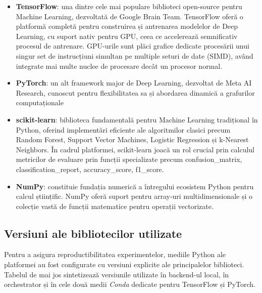 \documentclass[../../main.tex]{subfiles}
\begin{document}
        \begin{itemize}
	            \item \textbf{TensorFlow}: una dintre cele mai populare biblioteci open-source pentru Machine Learning, dezvoltată de Google Brain Team. TensorFlow oferă o platformă completă pentru construirea și antrenarea modelelor de Deep Learning, cu suport nativ pentru GPU, ceea ce accelerează semnificativ procesul de antrenare. GPU-urile sunt plăci grafice dedicate procesării unui singur set de instrucțiuni simultan pe multiple seturi de date (SIMD), având integrate mai multe nuclee de procesare decât un procesor normal.

            \item \textbf{PyTorch}: un alt framework major de Deep Learning, dezvoltat de Meta AI Research, cunoscut pentru flexibilitatea sa și abordarea dinamică a grafurilor computaționale

            \item \textbf{scikit-learn}: biblioteca fundamentală pentru Machine Learning tradițional în Python, oferind implementări eficiente ale algoritmilor clasici precum Random Forest, Support Vector Machines, Logistic Regression și k-Nearest Neighbors. În cadrul platformei, scikit-learn joacă un rol crucial prin calculul metricilor de evaluare prin funcții specializate precum confusion\_matrix, classification\_report, accuracy\_score, f1\_score.

            \item \textbf{NumPy}: constituie fundația numerică a întregului ecosistem Python pentru calcul științific. NumPy oferă suport pentru array-uri multidimensionale și o colecție vastă de funcții matematice pentru operații vectorizate.

        \end{itemize}

        \subsection{Versiuni ale bibliotecilor utilizate}

        Pentru a asigura reproductibilitatea experimentelor, mediile Python ale platformei au fost configurate cu versiuni explicite ale principalelor biblioteci. Tabelul de mai jos sintetizează versiunile utilizate în backend-ul local, în orchestrator și în cele două medii \textit{Conda} dedicate pentru TensorFlow și PyTorch.
\end{document}
